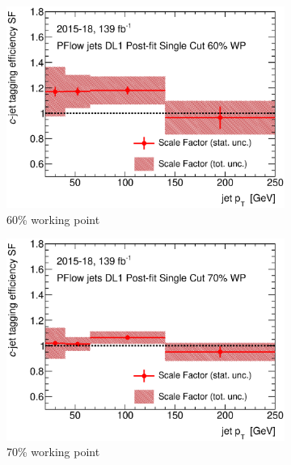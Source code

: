 \newpage
\begin{figure}[H]
	\centering
	\begin{subfigure}[t]{.35\linewidth}
		\includegraphics[width=1\textwidth]{FTAG_plots/DL1allPFlowDec/SF60.eps}
		\caption{60\% working point}
			\end{subfigure}
		\begin{subfigure}[t]{.35\linewidth}
			\includegraphics[width=1\textwidth]{FTAG_plots/DL1allPFlowDec/SF70.eps}
			\caption{70\% working point}
		\end{subfigure}
		\begin{subfigure}[t]{.35\linewidth}

\end{subfigure}
\end{figure}
